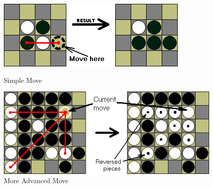 \documentclass[12pt,a4paper, openany]{report}
\begin{document}
\begin{figure}[ht]
\begin{minipage}[c]{0.5\linewidth}
\begin{center}
\includegraphics[scale=0.3]{move1}
\caption{Simple Move}
\end{center}
\end{minipage}
\hfill
\begin{minipage}[c]{0.5\linewidth}
\begin{center}
\includegraphics[scale=0.25]{move2}
\caption{More Advanced Move}
\end{center}
\end{minipage}
\hfill
\end{figure}

\pagebreak
\end{document}

